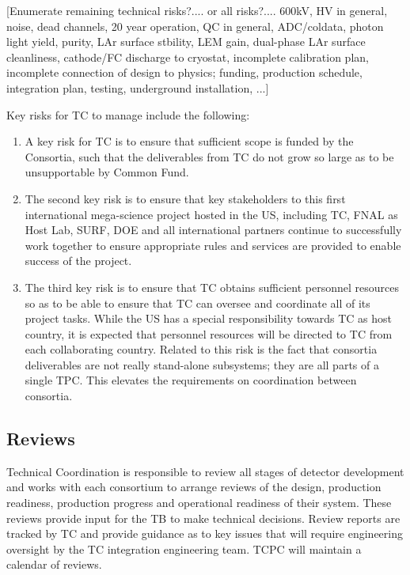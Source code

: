 [Enumerate remaining technical risks?.... or all risks?.... 600kV, HV
  in general, noise, dead channels, 20 year operation, QC in general,
  ADC/coldata, photon light yield, purity, LAr surface stbility, LEM
  gain, dual-phase LAr surface cleanliness, cathode/FC discharge to
  cryostat, incomplete calibration plan, incomplete connection of
  design to physics; funding, production schedule, integration plan,
  testing, underground installation, ...]

Key risks for TC to manage include the following:
\begin{enumerate}
  \item A key risk for TC is to ensure that sufficient scope is funded
    by the Consortia, such that the deliverables from TC do not grow
    so large as to be unsupportable by Common Fund.
  \item The second key risk is to ensure that key stakeholders to this
    first international mega-science project hosted in the US,
    including TC, FNAL as Host Lab, SURF, DOE and all international
    partners continue to successfully work together to ensure
    appropriate rules and services are provided to enable success of
    the project.
  \item The third key risk is to ensure that TC obtains sufficient
    personnel resources so as to be able to ensure that TC can oversee
    and coordinate all of its project tasks.  While the US has a
    special responsibility towards TC as host country, it is expected
    that personnel resources will be directed to TC from each
    collaborating country. Related to this risk is the fact that
    consortia deliverables are not really stand-alone subsystems; they
    are all parts of a single TPC. This elevates the requirements on
    coordination between consortia.
\end{enumerate}



\subsection{Reviews}
\label{sec:fdsp-coord-reviews}

Technical Coordination is responsible to review all stages of detector
development and works with each consortium to arrange reviews of the
design, production readiness, production progress and operational
readiness of their system.  These reviews provide input for the TB to
make technical decisions.  Review reports are tracked by TC and
provide guidance as to key issues that will require engineering
oversight by the TC integration engineering team. TCPC will maintain a
calendar of  reviews.

